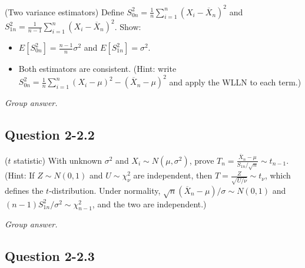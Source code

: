 \documentclass[11pt,letterpaper]{article}
\newenvironment{groupanswer}
  {\par\smallskip\noindent\textit{Group answer.}\par\nopagebreak\smallskip}
  {\par\medskip}
\begin{document}
\label{q:lec2-2-1}


(Two variance estimators) Define
$S_{0n}^2=\frac{1}{n}\sum_{i=1}^n (X_i-\overline{X}_n)^2$ and
$S_{1n}^2=\frac{1}{n-1}\sum_{i=1}^n (X_i-\overline{X}_n)^2$. Show:
\begin{itemize}
    \item[i)] $E[S_{0n}^2]=\frac{n-1}{n}\sigma^2$ and $E[S_{1n}^2]=\sigma^2$.
    \item[ii)] Both estimators are consistent. (Hint: write $S_{0n}^2=\frac{1}{n}\sum_{i=1}^n(X_i-\mu)^2-(\overline{X}_n-\mu)^2$ and apply the WLLN to each term.)
\end{itemize}


\begin{groupanswer}
\vspace{\baselineskip}
\end{groupanswer}


\subsection*{Question 2-2.2}

\label{q:lec2-2-2}


($t$ statistic) With unknown $\sigma^2$ and $X_i\sim N(\mu,\sigma^2)$, prove
$T_n=\frac{\overline{X}_n-\mu}{S_{1n}/\sqrt{n}} \sim t_{n-1}.$
(Hint: If $Z \sim N(0,1)$ and $U \sim \chi^2_\nu$ are independent, then
$T = \frac{Z}{\sqrt{U/\nu}} \sim t_\nu$, which defines the $t$-distribution. Under normality, $\sqrt{n}(\overline{X}_n-\mu)/\sigma \sim N(0,1)$ and $(n-1)S_{1n}^2/\sigma^2\sim \chi^2_{n-1}$, and the two are independent.)


\begin{groupanswer}
\vspace{\baselineskip}
\end{groupanswer}


\subsection*{Question 2-2.3}
\end{document}
